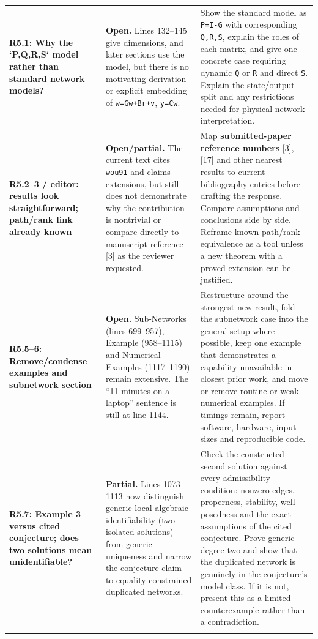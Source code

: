 \documentclass[11pt,a4paper]{article}
\begin{document}
\begin{longtable}{@{}p{}p{}p{}@{}}
\textbf{R5.1: Why the `P,Q,R,S` model rather than standard network models?} & \textbf{Open.} Lines 132–145 give dimensions, and later sections use the model, but there is no motivating derivation or explicit embedding of \texttt{w=Gw+Br+v}, \texttt{y=Cw}. & Show the standard model as \texttt{P=I-G} with corresponding \texttt{Q,R,S}, explain the roles of each matrix, and give one concrete case requiring dynamic \texttt{Q} or \texttt{R} and direct \texttt{S}. Explain the state/output split and any restrictions needed for physical network interpretation.\\\addlinespace\midrule
\textbf{R5.2–3 / editor: results look straightforward; path/rank link already known} & \textbf{Open/partial.} The current text cites \texttt{wou91} and claims extensions, but still does not demonstrate why the contribution is nontrivial or compare directly to manuscript reference [3] as the reviewer requested. & Map \textbf{submitted-paper reference numbers} [3], [17] and other nearest results to current bibliography entries before drafting the response. Compare assumptions and conclusions side by side. Reframe known path/rank equivalence as a tool unless a new theorem with a proved extension can be justified.\\\addlinespace\midrule
\textbf{R5.5–6: Remove/condense examples and subnetwork section} & \textbf{Open.} Sub-Networks (lines 699–957), Example (958–1115) and Numerical Examples (1117–1190) remain extensive. The “11 minutes on a laptop” sentence is still at line 1144. & Restructure around the strongest new result, fold the subnetwork case into the general setup where possible, keep one example that demonstrates a capability unavailable in closest prior work, and move or remove routine or weak numerical examples. If timings remain, report software, hardware, input sizes and reproducible code.\\\addlinespace\midrule
\textbf{R5.7: Example 3 versus cited conjecture; does two solutions mean unidentifiable?} & \textbf{Partial.} Lines 1073–1113 now distinguish generic local algebraic identifiability (two isolated solutions) from generic uniqueness and narrow the conjecture claim to equality-constrained duplicated networks. & Check the constructed second solution against every admissibility condition: nonzero edges, properness, stability, well-posedness and the exact assumptions of the cited conjecture. Prove generic degree two and show that the duplicated network is genuinely in the conjecture's model class. If it is not, present this as a limited counterexample rather than a contradiction.\\\addlinespace\midrule

\end{longtable}
\end{document}
